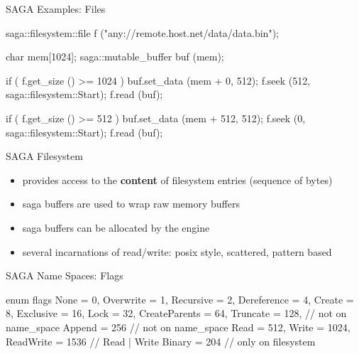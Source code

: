 \documentclass[%
  pdf,
  colorBG,
  slideColor,
  frames,
  ogf
]{prosper}
\newcommand{\B}[1]{\textbf{#1}}
\newcommand{\dn}{\vspace*{+1em}}
\begin{document}

 \begin{slide}{SAGA Examples: Files}

  \begin{mycode}[label=file access]
  saga::filesystem::file f ("any://remote.host.net/data/data.bin");

  char mem[1024];
  saga::mutable_buffer buf (mem);

  if ( f.get_size () >= 1024 )
  {
    buf.set_data (mem + 0, 512);
    f.seek (512, saga::filesystem::Start);
    f.read (buf);
  }

  if ( f.get_size () >= 512 )
  {
    buf.set_data (mem + 512, 512);
    f.seek (0, saga::filesystem::Start);
    f.read (buf);
  }
  \end{mycode}
   
 \end{slide}


 \begin{slide}{SAGA Filesystem}

  \dn\dn

  \begin{itemize}
   \item provides access to the \B{content} of filesystem entries
   (sequence of bytes)

   \item saga buffers are used to wrap raw memory buffers

   \item saga buffers can be allocated by the engine

   \item several incarnations of read/write: posix style,
   scattered, pattern based

  \end{itemize}
   
 \end{slide}


 \begin{slide}{SAGA Name Spaces: Flags}

  \begin{mycode}[label=flags]
  enum flags {
    None          = 0, 
    Overwrite     = 1, 
    Recursive     = 2, 
    Dereference   = 4, 
    Create        = 8, 
    Exclusive     = 16, 
    Lock          = 32, 
    CreateParents = 64, 
    Truncate      = 128,   // not on name_space
    Append        = 256    // not on name_space
    Read          = 512,   
    Write         = 1024,   
    ReadWrite     = 1536   // Read | Write 
    Binary        = 204    // only on filesystem
  }
  \end{mycode}
   
 \end{slide}
\end{document}
